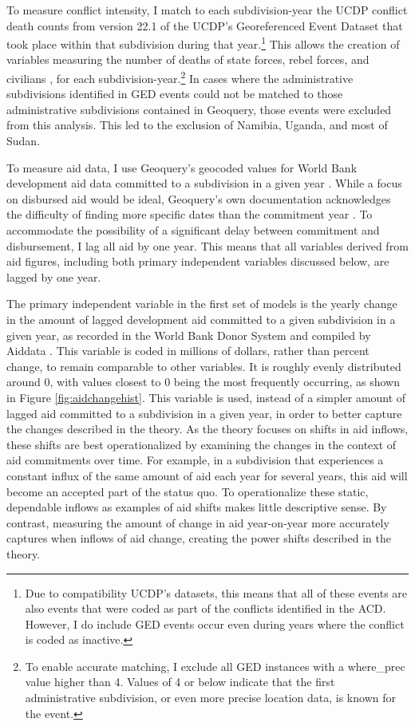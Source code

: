 \documentclass[12pt, letterpaper]{article}
\renewcommand{\cite}{\citep}
\begin{document}
	To measure conflict intensity, I match to each subdivision-year the UCDP conflict death counts from version 22.1 of the UCDP’s Georeferenced Event Dataset \cite{sundberg2013introducing} that took place within that subdivision during that year.\footnote{Due to compatibility UCDP’s datasets, this means that all of these events are also events that were coded as part of the conflicts identified in the ACD. However, I do include GED events occur even during years where the conflict is coded as inactive.} This allows the creation of variables measuring the number of deaths of state forces, rebel forces, and civilians , for each subdivision-year.\footnote{To enable accurate matching, I exclude all GED instances with a where\_prec value higher than 4. Values of 4 or below indicate that the first administrative subdivision, or even more precise location data, is known for the event.} In cases where the administrative subdivisions identified in GED events could not be matched to those administrative subdivisions contained in Geoquery, those events were excluded from this analysis. This led to the exclusion of Namibia, Uganda, and most of Sudan. 
	
	To measure aid data, I use Geoquery’s geocoded values for World Bank development aid data committed to a subdivision in a given year \cite{aiddatav142}. While a focus on disbursed aid would be ideal, Geoquery’s own documentation acknowledges the difficulty of finding more specific dates than the commitment year \cite{strandow2011ucdp}. To accommodate the possibility of a significant delay between commitment and disbursement, I lag all aid by one year. This means that all variables derived from aid figures, including both primary independent variables discussed below, are lagged by one year.
	
	 The primary independent variable in the first set of models is the yearly change in the amount of lagged development aid committed to a given subdivision in a given year, as recorded in the World Bank Donor System and compiled by Aiddata \cite{aiddatav142}. This variable is coded in millions of dollars, rather than percent change, to remain comparable to other variables. It is roughly evenly distributed around 0, with values closest to 0 being the most frequently occurring, as shown in Figure \ref{fig:aidchangehist}. This variable is used, instead of a simpler amount of lagged aid committed to a subdivision in a given year, in order to better capture the changes described in the theory. As the theory focuses on shifts in aid inflows, these shifts are best operationalized by examining the changes in the context of aid commitments over time. For example, in a subdivision that experiences a constant influx of the same amount of aid each year for several years, this aid will become an accepted part of the status quo. To operationalize these static, dependable inflows as examples of aid shifts makes little descriptive sense. By contrast, measuring the amount of change in aid year-on-year more accurately captures when inflows of aid change, creating the power shifts described in the theory. 
	
\end{document}
